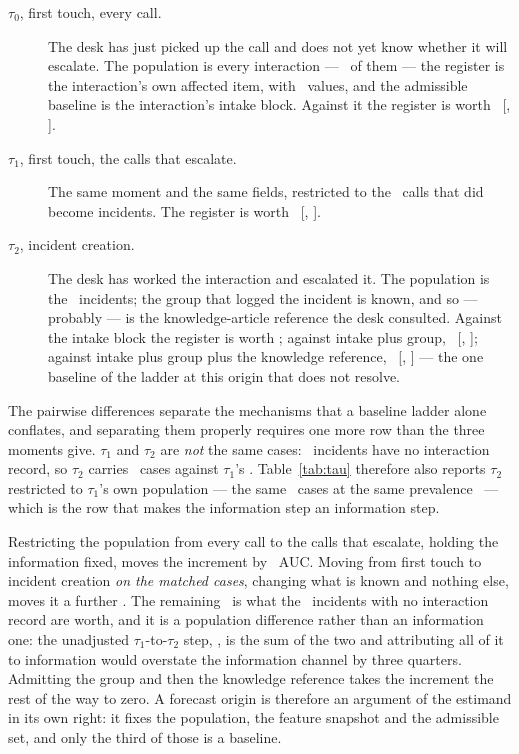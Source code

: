 \begin{description}
\item[$\tau_0$, first touch, every call.] The desk has just picked up the
call and does not yet know whether it will escalate. The population is every
interaction --- \nTauZero\ of them --- the register is the interaction's own
affected item, with \cardTauZero\ values, and the admissible baseline is the
interaction's intake block. Against it the register is worth \VtauZero\
[\VtauZeroLo, \VtauZeroHi].
\item[$\tau_1$, first touch, the calls that escalate.] The same moment and
the same fields, restricted to the \nTauOne\ calls that did become incidents.
The register is worth \VtauOne\ [\VtauOneLo, \VtauOneHi].
\item[$\tau_2$, incident creation.] The desk has worked the interaction and
escalated it. The population is the \nTauTwo\ incidents; the group that logged
the incident is known, and so --- probably --- is the knowledge-article
reference the desk consulted. Against the intake block the register is worth
\VtauTwo; against intake plus group, \VTtwoGroup\ [\VTtwoGroupLo,
\VTtwoGroupHi]; against intake plus group plus the knowledge reference,
\VTtwoKnow\ [\VTtwoKnowLo, \VTtwoKnowHi] --- the one baseline of the ladder at
this origin that does not resolve.
\end{description}

The pairwise differences separate the mechanisms that a baseline ladder alone
conflates, and separating them properly requires one more row than the three
moments give. $\tau_1$ and $\tau_2$ are \emph{not} the same cases:
\nTauTwoUnmatched\ incidents have no interaction record, so $\tau_2$ carries
\nTauTwo\ cases against $\tau_1$'s \nTauOne. Table~\ref{tab:tau} therefore
also reports $\tau_2$ restricted to $\tau_1$'s own population --- the same
\nTauTwoMatched\ cases at the same prevalence \prevTauOne\ --- which is the
row that makes the information step an information step.

Restricting the population from every call to the calls that escalate, holding
the information fixed, moves the increment by \deltaCohortAtTau\ AUC. Moving
from first touch to incident creation \emph{on the matched cases}, changing
what is known and nothing else, moves it a further \deltaSnapshotAtTau. The
remaining \deltaPopulationResidual\ is what the \nTauTwoUnmatched\ incidents
with no interaction record are worth, and it is a population difference rather
than an information one: the unadjusted $\tau_1$-to-$\tau_2$ step,
\deltaSnapshotUnmatched, is the sum of the two and attributing all of it to
information would overstate the information channel by three quarters.
Admitting the group and then the knowledge reference takes the increment the
rest of the way to zero. A forecast origin is therefore an argument of the
estimand in its own right: it fixes the population, the feature snapshot and
the admissible set, and only the third of those is a baseline.

